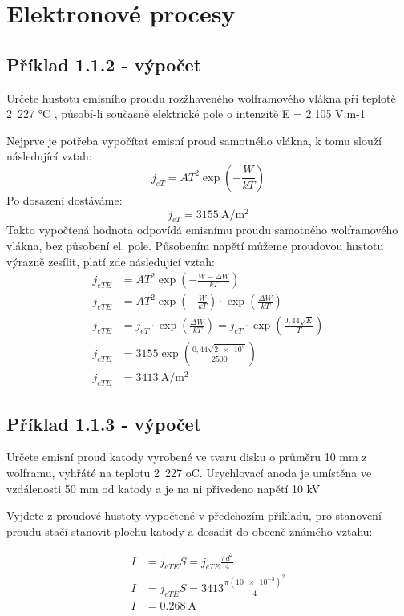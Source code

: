 \section{Elektronové procesy}

\subsection{Příklad 1.1.2 - výpočet}
\begin{zadani}
    Určete hustotu emisního proudu rozžhaveného wolframového vlákna 
    při teplotě 2 227 °C , působí-li současně elektrické pole o intenzitě 
    E = 2.105 V.m-1
\end{zadani}

Nejprve je potřeba vypočítat emisní proud samotného vlákna, k tomu slouží následující vztah:
\[
    j_{eT} = A T^2 \exp\left(-\frac{W}{kT}\right)
\]
Po dosazení dostáváme:
\[
    j_{eT} =\qty{3155}{\ampere\per\square\meter}
\]
Takto vypočtená hodnota odpovídá emisnímu proudu samotného wolframového vlákna, bez působení el. pole. Působením napětí můžeme proudovou hustotu výrazně zesílit, platí zde následující vztah:
\begin{align*}
    j_{eTE} &= A T^2 \exp\left(-\frac{W-\Delta W}{kT}\right) \\
    j_{eTE} &= A T^2 \exp\left(-\frac{W}{kT}\right) \cdot \exp\left(\frac{\Delta W}{kT}\right) \\
    j_{eTE} &= j_{eT} \cdot \exp\left(\frac{\Delta W}{kT}\right)= j_{eT} \cdot \exp\left(\frac{0,44\sqrt{E} }{T}\right)\\
    j_{eTE} &= \num{3155}\exp\left(\frac{0,44\sqrt{\num{2e5}} }{\num{2500}}\right) \\
    j_{eTE} &= \qty{3413}{\ampere\per\square\meter }
\end{align*}



\subsection{Příklad 1.1.3 - výpočet}
\begin{zadani}
    Určete emisní proud katody vyrobené ve tvaru disku o průměru 10 mm
    z wolframu, vyhřáté na teplotu 2 227 oC. Urychlovací anoda je umístěna 
    ve vzdálenosti  50 mm  od katody a je na ni přivedeno napětí  10 kV
\end{zadani}

Vyjdete z proudové hustoty vypočtené v předchozím příkladu, pro stanovení proudu stačí stanovit plochu katody a dosadit do obecně známého vztahu:

\begin{align*}
  I&=j_{eTE} S = j_{eTE} \frac{\pi d^2}{4}\\
  I&=j_{eTE} S = \num{3413} \frac{\pi (\num{10e-3})^2}{4}\\
  I&=\qty{0.268}{\ampere}
\end{align*}

